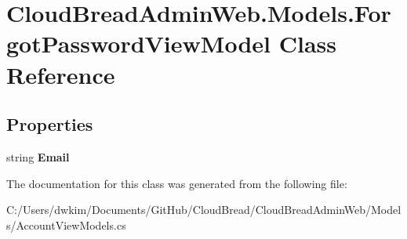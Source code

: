 \hypertarget{a00079}{}\section{Cloud\+Bread\+Admin\+Web.\+Models.\+Forgot\+Password\+View\+Model Class Reference}
\label{a00079}
\subsection*{Properties}
\begin{DoxyCompactItemize}
\item 
string {\bfseries Email}\hypertarget{a00079_af77b60581e2d17267d66cef30a60a6c1}{}\label{a00079_af77b60581e2d17267d66cef30a60a6c1}

\end{DoxyCompactItemize}


The documentation for this class was generated from the following file\+:\begin{DoxyCompactItemize}
\item 
C\+:/\+Users/dwkim/\+Documents/\+Git\+Hub/\+Cloud\+Bread/\+Cloud\+Bread\+Admin\+Web/\+Models/Account\+View\+Models.\+cs\end{DoxyCompactItemize}
